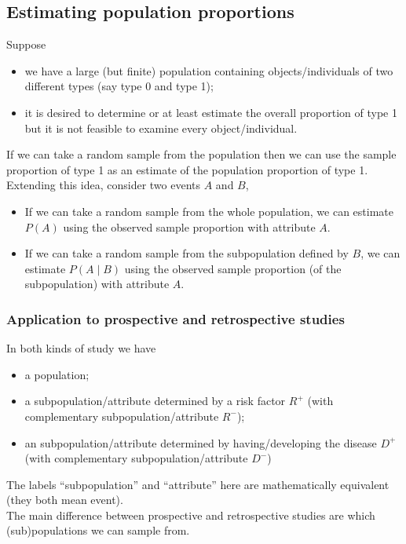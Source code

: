 \documentclass[a4paper]{article}
\begin{document}
\subsection{Estimating population proportions}
Suppose
\begin{itemize}
	\item we have a large (but finite) population containing objects/individuals of two different types (say type 0 and type 1);
	\item it is desired to determine or at least estimate the overall proportion of type 1 but it is not feasible to examine every object/individual.
\end{itemize}
If we can take a random sample from the population then we can use the sample proportion of type 1 as an estimate of the population proportion of type 1.\\
Extending this idea, consider two events \( A \) and \( B \),
\begin{itemize}
	\item If we can take a random sample from the whole population, we can estimate \( P(A) \) using the observed sample proportion with attribute \( A \).
	\item If we can take a random sample from the subpopulation defined by \( B \), we can estimate \( P(A \mid B) \) using the observed sample proportion (of the subpopulation) with attribute \( A \).
\end{itemize}
\subsubsection{Application to prospective and retrospective studies}
In both kinds of study we have
\begin{itemize}
	\item a population;
	\item a subpopulation/attribute determined by a risk factor \( R^+ \) (with complementary subpopulation/attribute \( R^- \));
	\item an subpopulation/attribute determined by having/developing the disease \( D^+ \) (with complementary subpopulation/attribute \( D^- \))
\end{itemize}
The labels ``subpopulation'' and ``attribute'' here are mathematically equivalent (they both mean event).\\
The main difference between prospective and retrospective studies are which (sub)populations we can sample from.
\end{document}
